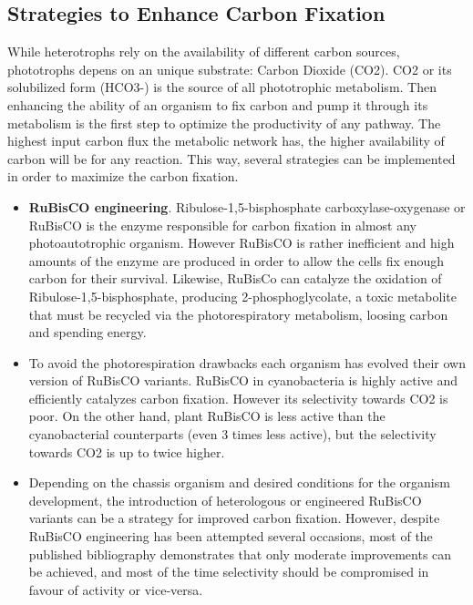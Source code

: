 \subsection{Strategies to Enhance Carbon Fixation}
While heterotrophs rely on the availability of different carbon sources, phototrophs depens on an unique substrate: Carbon Dioxide (CO2). CO2 or its solubilized form (HCO3-) is the source of all phototrophic metabolism. Then enhancing the ability of an organism to fix carbon and pump it through its metabolism is the first step to optimize the productivity of any pathway. The highest input carbon flux the metabolic network has, the higher availability of carbon will be for any reaction. This way, several strategies can be implemented in order to maximize the carbon fixation.
 \begin{itemize}
     \item[] \textbf{RuBisCO engineering}. Ribulose-1,5-bisphosphate carboxylase-oxygenase or RuBisCO is the enzyme responsible for carbon fixation in almost any photoautotrophic organism. However RuBisCO is rather inefficient and high amounts of the enzyme are produced in order to allow the cells fix enough carbon for their survival. Likewise, RuBisCo can catalyze the oxidation of Ribulose-1,5-bisphosphate, producing 2-phosphoglycolate, a toxic metabolite that must be recycled via the photorespiratory metabolism, loosing carbon and spending energy.
     \item[] To avoid the photorespiration drawbacks each organism has evolved their own version of RuBisCO variants. RuBisCO in cyanobacteria is highly active and efficiently catalyzes carbon fixation. However its selectivity towards CO2 is poor. On the other hand, plant RuBisCO is less active than the cyanobacterial counterparts (even 3 times less active), but the selectivity towards CO2 is up to twice higher.
    \item[] Depending on the chassis organism and desired conditions for the organism development, the introduction of heterologous or engineered RuBisCO variants can be a strategy for improved carbon fixation. However, despite RuBisCO engineering has been attempted several occasions, most of the published bibliography demonstrates that only moderate improvements can be achieved, and most of the time selectivity should be compromised in favour of activity or vice-versa.
 

\end{itemize}
